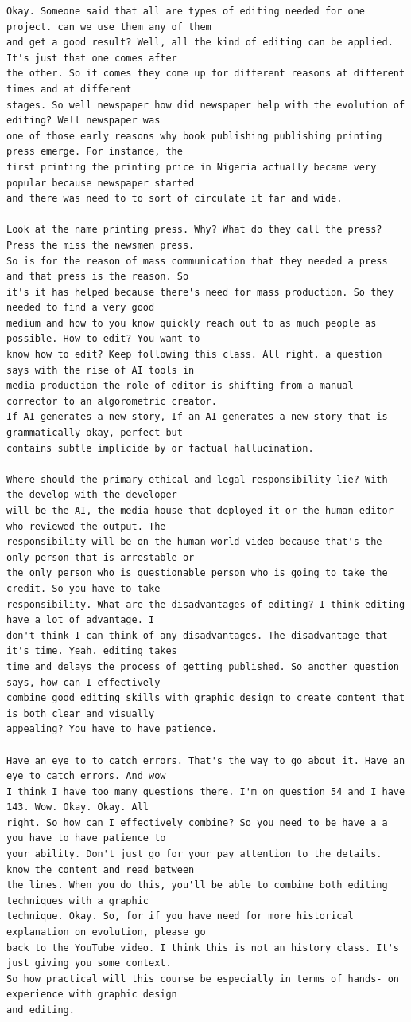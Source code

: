 {\begin{Verbatim}
Okay. Someone said that all are types of editing needed for one project. can we use them any of them
and get a good result? Well, all the kind of editing can be applied. It's just that one comes after
the other. So it comes they come up for different reasons at different times and at different
stages. So well newspaper how did newspaper help with the evolution of editing? Well newspaper was
one of those early reasons why book publishing publishing printing press emerge. For instance, the
first printing the printing price in Nigeria actually became very popular because newspaper started
and there was need to to sort of circulate it far and wide.

Look at the name printing press. Why? What do they call the press? Press the miss the newsmen press.
So is for the reason of mass communication that they needed a press and that press is the reason. So
it's it has helped because there's need for mass production. So they needed to find a very good
medium and how to you know quickly reach out to as much people as possible. How to edit? You want to
know how to edit? Keep following this class. All right. a question says with the rise of AI tools in
media production the role of editor is shifting from a manual corrector to an algorometric creator.
If AI generates a new story, If an AI generates a new story that is grammatically okay, perfect but
contains subtle implicide by or factual hallucination.

Where should the primary ethical and legal responsibility lie? With the develop with the developer
will be the AI, the media house that deployed it or the human editor who reviewed the output. The
responsibility will be on the human world video because that's the only person that is arrestable or
the only person who is questionable person who is going to take the credit. So you have to take
responsibility. What are the disadvantages of editing? I think editing have a lot of advantage. I
don't think I can think of any disadvantages. The disadvantage that it's time. Yeah. editing takes
time and delays the process of getting published. So another question says, how can I effectively
combine good editing skills with graphic design to create content that is both clear and visually
appealing? You have to have patience.

Have an eye to to catch errors. That's the way to go about it. Have an eye to catch errors. And wow
I think I have too many questions there. I'm on question 54 and I have 143. Wow. Okay. Okay. All
right. So how can I effectively combine? So you need to be have a a you have to have patience to
your ability. Don't just go for your pay attention to the details. know the content and read between
the lines. When you do this, you'll be able to combine both editing techniques with a graphic
technique. Okay. So, for if you have need for more historical explanation on evolution, please go
back to the YouTube video. I think this is not an history class. It's just giving you some context.
So how practical will this course be especially in terms of hands- on experience with graphic design
and editing.


\end{Verbatim}}
